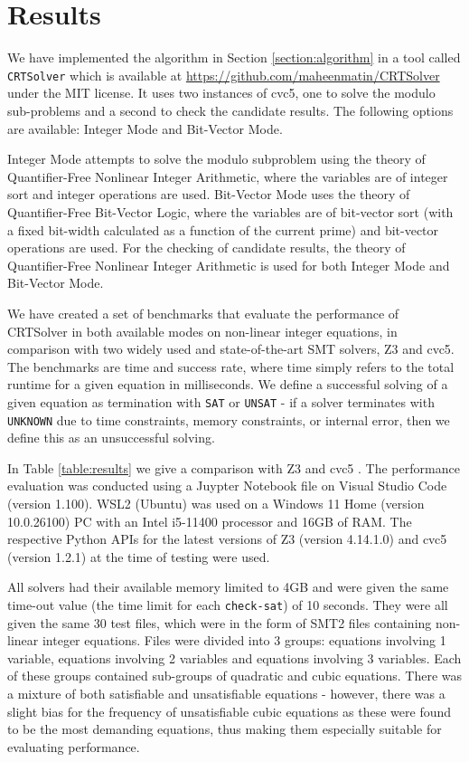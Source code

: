 \section{Results}
\label{section:results}

We have implemented the algorithm in Section \ref{section:algorithm}
in a tool called \texttt{CRTSolver} which is available at
\url{https://github.com/maheenmatin/CRTSolver} under the MIT license.
%
It uses two instances of cvc5, one to solve the modulo sub-problems
and a second to check the candidate results.  The following options
are available: Integer Mode and Bit-Vector Mode. 

Integer Mode attempts to
solve the modulo subproblem using the theory of Quantifier-Free Nonlinear
Integer Arithmetic, where the variables are of integer sort and integer
operations are used. 
Bit-Vector Mode uses the theory of Quantifier-Free
Bit-Vector Logic, where the variables are of bit-vector sort (with a fixed
bit-width calculated as a function of the current prime) and bit-vector
operations are used.
For the checking of candidate results, the theory of Quantifier-Free
Nonlinear Integer Arithmetic is used for both Integer Mode and Bit-Vector
Mode.

We have created a set of benchmarks that evaluate the performance of CRTSolver 
in both available modes on non-linear integer equations, in comparison with two
widely used and state-of-the-art SMT solvers, Z3 and cvc5.
The benchmarks are time and success rate, where time simply refers to the total runtime
for a given equation in milliseconds. We define a successful solving of a given
equation as termination with \texttt{SAT} or \texttt{UNSAT} - if a solver terminates
with \texttt{UNKNOWN} due to time constraints, memory constraints, or internal error,
then we define this as an unsuccessful solving.

In Table \ref{table:results} we give a comparison with Z3 \cite{10.1007/978-3-540-78800-3_24} and cvc5 \cite{DBLP:conf/tacas/BarbosaBBKLMMMN22}.
The performance evaluation was conducted using a Juypter Notebook file on Visual Studio Code (version 1.100).
WSL2 (Ubuntu) was used on a Windows 11 Home (version 10.0.26100) PC with an Intel i5-11400 processor and 
16GB of RAM. The respective Python APIs for the latest versions of Z3 (version 4.14.1.0) and cvc5 
(version 1.2.1) at the time of testing were used.

All solvers had their available memory limited to 4GB and were given the same time-out value 
(the time limit for each \texttt{check-sat}) of 10 seconds.
They were all given the same 30 test 
files, which were in the form of SMT2 files containing non-linear integer equations. Files were divided into 3 
groups: equations involving 1 variable, equations involving 2 variables and equations involving 3 variables. 
Each of these groups contained sub-groups of quadratic and cubic equations. There was a mixture of both 
satisfiable and unsatisfiable equations - however, there was a slight bias for the frequency of unsatisfiable 
cubic equations as these were found to be the most demanding equations, thus making them especially suitable 
for evaluating performance.

